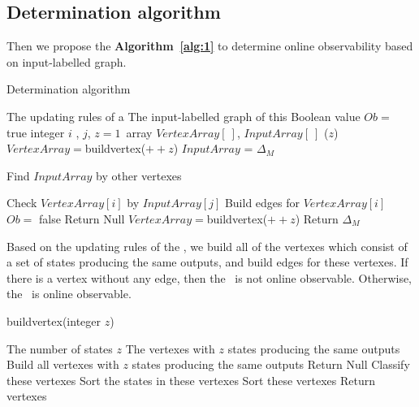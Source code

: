  \subsection{Determination algorithm}
 Then we propose the {\bf Algorithm~\ref{alg:1}} to determine online observability based on input-labelled graph.%

\begin{algorithm}[h]
\caption{Determination algorithm}
\begin{algorithmic}[1]
\REQUIRE 
The updating rules of a \BCN
\ENSURE  
The input-labelled graph of this \BCN
\STATE Boolean value $Ob=$ true 
\STATE integer $i$ , $j$, $z=1$\
\STATE array $VertexArray[\ ]$, $InputArray[\ ]$
($z$)
\STATE $VertexArray=${\sf buildvertex}($++z$)
\STATE $InputArray$ = $\Delta_M$ 
\ELSE

\STATE Find $InputArray$ by other vertexes

\ENDIF
{}
\STATE Check $VertexArray[i]$ by $InputArray[j]$ 
\STATE Build edges for $VertexArray[i]$ 
\ENDFOR
{}
\STATE  $Ob=$ false 
\STATE Return Null
\ENDIF
\ENDFOR
\STATE $VertexArray=${\sf buildvertex}($++z$)
\ENDWHILE
\STATE Return $\Delta_M$\
\end{algorithmic}
 \label{alg:1}
\end{algorithm}


 Based on the updating rules of the \BCN, we build all of the vertexes which consist of a set of states producing the same outputs, and build edges for these vertexes. If there is a vertex without any edge, then the \BCN\ is not online observable. Otherwise, the \BCN\ is online observable.

\begin{algorithm}[h!]
\caption{{\sf buildvertex}(integer $z$)}
\begin{algorithmic}[1]
\REQUIRE 
The number of states $z$
\ENSURE  
The vertexes with $z$ states producing the same outputs 
\STATE  Build all vertexes with $z$ states producing the same outputs 
\IF{(Failed to build)} 
\STATE  Return Null
\ELSE 
\STATE  Classify these vertexes
\STATE Sort the states in these vertexes
\STATE Sort these vertexes
\STATE Return vertexes
\ENDIF 
\end{algorithmic}
 \label{alg:2}
\end{algorithm}

